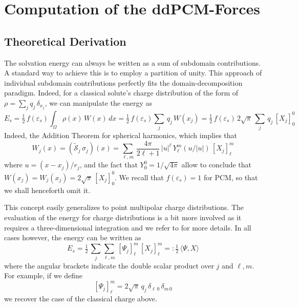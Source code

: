 \documentclass[aip,jcp,a4paper,11pt]{revtex4-1}
\newcommand{\cS}{\mathcal{S}}
\begin{document}
\section{Computation of the ddPCM-Forces}\label{sec:forces}

\subsection{Theoretical Derivation}

The solvation energy can always be written as a sum of subdomain contributions. A standard way to achieve this is to employ a partition of unity. This  approach of individual subdomain contributions perfectly fits the domain-decomposition paradigm. Indeed, for a classical solute's charge distribution of the form of $\rho=\sum_j q_j \, \delta_{x_j}$, we can manipulate the energy as
\[
	E_s 
	= \tfrac{1}{2} \, f(\varepsilon_s)  \int_{\Omega} \rho(x) \, W(x) \, dx
	= \tfrac{1}{2} \, f(\varepsilon_s) \sum_j \, q_j \,  W(x_j)
	= \tfrac{1}{2} \, f(\varepsilon_s) \,{2\sqrt{\pi}}\, \sum_j  \,q_j \, [X_j]_0^0
\]
Indeed, the Addition Theorem for spherical harmonics, which implies that
\[
W_j(x) = (\tilde{\cS}_j \, \sigma_j)(x)  = \sum_{\ell,m} \, \frac{4\pi}{ 2\ell + 1} \, |u|^\ell \, Y_\ell^m(u/|u|) \, [X_j]_\ell^m
\]
where $u = (x-x_j)/r_j$, and the fact that $Y_0^0 = 1/ \sqrt{4\pi}$ allow to conclude that $W(x_j) = W_j(x_j) = 2 \sqrt{\pi} \, [X_j]_0^0$. We recall that $f(\varepsilon_s) =1$ for PCM, so that we shall henceforth omit it.

This concept easily generalizes to point multipolar charge distributions. 
The evaluation of the energy for charge distributions is a bit more involved as it requires a three-dimensional integration and we refer to \cite{Lipparini_JCP_ddCOSMO-QM} for more details. In all cases however, the energy can be written as
\[
E_s = \tfrac{1}{2}
 \, \sum_j \sum_{\ell,m} \, [\Psi_j]_\ell^m \,[X_j]_\ell^m
  =: \tfrac{1}{2} 
  \,\langle \Psi, X \rangle
\]
where the angular brackets indicate the double scalar product over $j$ and $\ell,m$.
For example, if we define
\[
	[\Psi_j]_\ell^m = 2{\sqrt{\pi}}\, q_j \, \delta_{\ell\,0} \,\delta_{m\,0}
\]
we recover the case of  the classical charge above.
\end{document}
